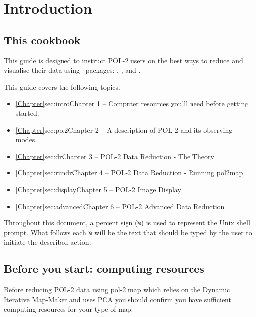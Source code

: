 \chapter{Introduction}
\label{sec:intro}

\renewcommand{\thepage}{\arabic{page}}
\setcounter{page}{1}

\section{This cookbook}

This guide is designed to instruct POL-2 users on the best ways to
reduce and visualise their data using \starlink\ packages:
\smurf \cite{smurf}, \Kappa \cite{kappa}, and \gaia \cite{gaia}.

This guide covers the following topics.
\begin{itemize}
\itemsep0em
\item \cref{Chapter}{sec:intro}{Chapter 1} -- Computer resources you'll need before getting started.
\item \cref{Chapter}{sec:pol2}{Chapter 2} -- A description of POL-2 and its observing modes.
\item \cref{Chapter}{sec:dr}{Chapter 3} -- POL-2 Data Reduction - The Theory
\item \cref{Chapter}{sec:rundr}{Chapter 4} -- POL-2 Data Reduction - Running pol2map
\item \cref{Chapter}{sec:display}{Chapter 5} -- POL-2 Image Display
\item \cref{Chapter}{sec:advanced}{Chapter 6} -- POL-2 Advanced Data Reduction 

\end{itemize}

Throughout this document, a percent sign (\texttt{\%}) is used to
represent the Unix shell prompt. What follows each \texttt{\%} will be
the text that should be typed by the user to initiate the described action.

\section{ Before you start: computing resources}
\label{sec:computing}

Before reducing POL-2 data using pol-2 map which relies on the Dynamic 
Iterative Map-Maker and uses PCA you should confirm you have
sufficient computing resources for your type of map.

